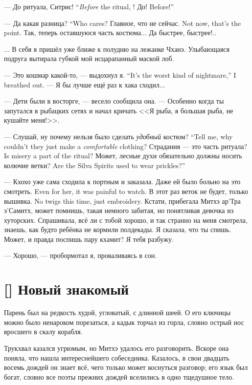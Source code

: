{--- \emph{До} ритуала, Ситрис!}
{``\emph{Before} the ritual, \Sitris!}
{До!}
{Before!''}

{--- Да какая разница?}
{``Who cares?}
{Главное, что не сейчас.}
{Not now, that's the point.}
Так, теперь оставшуюся часть костюма...
Да быстрее, быстрее!..

... В себя я пришёл уже ближе к полудню на лежанке Чханэ.
Улыбающаяся подруга вытирала губкой мой исцарапанный маской лоб.

{--- Это кошмар какой-то, --- выдохнул я.}
{``It's the worst kind of nightmare,'' I breathed out.}
--- Я бы лучше ещё раз к хака сходил...

--- Дети были в восторге, --- весело сообщила она.
--- Особенно когда ты запутался в рыбацких сетях и начал кричать <<Я рыба, я большая рыба, не кушайте меня!>>.

{--- Слушай, ну почему нельзя было сделать \emph{удобный} костюм?}
{``Tell me, why couldn't they just make a \emph{comfortable} clothing?}
{Страдания --- это часть ритуала?}
{Is misery a part of the ritual?}
{Может, лесные духи обязательно должны носить колючие ветки?}
{Are the Silva Spirits used to wear prickles?''}

--- Кхохо уже сама сходила к портным и заказала.
{Даже ей было больно на это смотреть.}
{Even for her, it was painful to watch.}
{В этот раз веток не будет, только вышивка.}
{No twigs this time, just embroidery.}
Кстати, прибегала Митхэ ар'Тра э'Самитх, может помнишь, такая немного забитая, но понятливая девочка из хуторских.
Спрашивала, всё ли с тобой хорошо, и так странно на меня смотрела, знаешь, как будто ребёнка не кормили полдекады.
Я сказала, что ты спишь.
Может, и правда поспишь пару кхамит?
Я тебя разбужу.

--- Хорошо, --- пробормотал я, проваливаясь в сон.

\section{[] Новый знакомый}

\textspace

Парень был на редкость худой, угловатый, с длинной шеей.
О его ключицы можно было ненароком порезаться, а кадык торчал из горла, словно острый нос вросшего в скалу корабля.

Трукхвал казался угрюмым, но Митхэ удалось его разговорить.
Вскоре она поняла, что нашла интереснейшего собеседника.
Казалось, в свои двадцать восемь дождей он знает всё, чего только может коснуться разговор;
его язык был богат, словно все поэты прежних дождей вселились в одно тщедушное тело.

